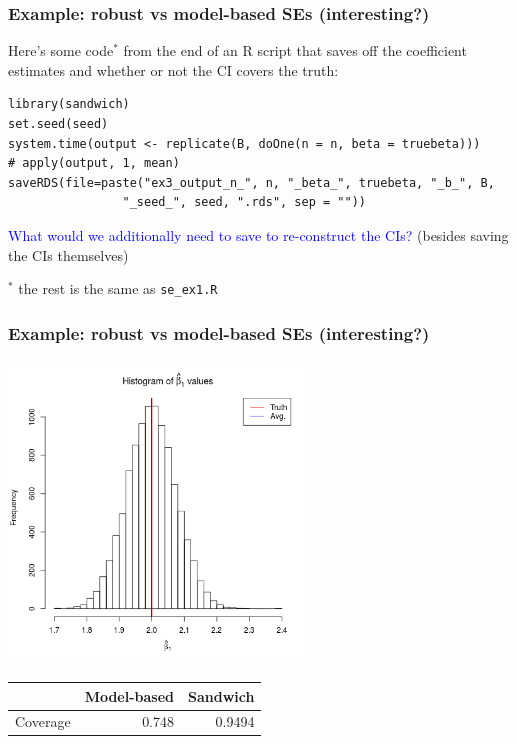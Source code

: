 \documentclass[12pt, 
hyperref={colorlinks=true, linkcolor=blue, urlcolor=cyan}]{beamer}
\begin{document}
\begin{frame}[fragile]
\frametitle{Example: robust vs model-based SEs \small (interesting?)}
Here's some code$^*$ from the end of an R script that saves off the coefficient estimates and whether or not the CI covers the truth: 
{\scriptsize
\begin{verbatim}
library(sandwich)
set.seed(seed)
system.time(output <- replicate(B, doOne(n = n, beta = truebeta)))
# apply(output, 1, mean)
saveRDS(file=paste("ex3_output_n_", n, "_beta_", truebeta, "_b_", B, 
                "_seed_", seed, ".rds", sep = ""))
\end{verbatim}
}

\textcolor{blue}{What would we additionally need to save to re-construct the CIs?} (besides saving the CIs themselves)

\small
${}^*$ the rest is the same as \texttt{se\_ex1.R}
\end{frame}

\begin{frame}
\frametitle{Example: robust vs model-based SEs \small (interesting?)}
\centering
\includegraphics[width = 0.6\textwidth]{se_ex3_beta_ests.png}
\small

\begin{tabular}[t]{l|r|r}
\hline
  & Model-based & Sandwich\\
\hline
Coverage & 0.748 & 0.9494\\
\hline
\end{tabular}
\end{frame}
\end{document}
